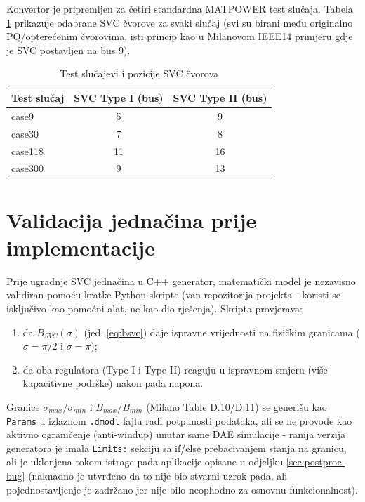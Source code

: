 \documentclass[11pt,a4paper]{report}
\begin{document}
Konvertor je pripremljen za četiri standardna MATPOWER test slučaja. Tabela
\ref{tab:test-cases} prikazuje odabrane SVC čvorove za svaki slučaj (svi su birani među
originalno PQ/opterećenim čvorovima, isti princip kao u Milanovom IEEE14 primjeru gdje je
SVC postavljen na bus 9).

\begin{table}[H]
\centering
\caption{Test slučajevi i pozicije SVC čvorova}
\label{tab:test-cases}
\begin{tabular}{@{}lcc@{}}
\toprule
Test slučaj & SVC Type I (bus) & SVC Type II (bus) \\
\midrule
case9   & 5  & 9  \\
case30  & 7  & 8  \\
case118 & 11 & 16 \\
case300 & 9  & 13 \\
\bottomrule
\end{tabular}
\end{table}

\section{Validacija jednačina prije implementacije}

Prije ugradnje SVC jednačina u C++ generator, matematički model je nezavisno validiran
pomoću kratke Python skripte (van repozitorija projekta - koristi se isključivo kao
pomoćni alat, ne kao dio rješenja). Skripta provjerava:
\begin{enumerate}
    \item da $B_{SVC}(\sigma)$ (jed. \ref{eq:bsvc}) daje ispravne vrijednosti na fizičkim
        granicama ($\sigma=\pi/2$ i $\sigma=\pi$);
    \item da oba regulatora (Type I i Type II) reaguju u ispravnom smjeru (više
        kapacitivne podrške) nakon pada napona.
\end{enumerate}

Granice $\sigma_{max}/\sigma_{min}$ i $B_{max}/B_{min}$ (Milano Table D.10/D.11) se
generišu kao \texttt{Params} u izlaznom \texttt{.dmodl} fajlu radi potpunosti podataka, ali
se ne provode kao aktivno ograničenje (anti-windup) unutar same DAE simulacije - ranija
verzija generatora je imala \texttt{Limits:} sekciju sa if/else prebacivanjem stanja na
granicu, ali je uklonjena tokom istrage pada aplikacije opisane u odjeljku
\ref{sec:postproc-bug} (naknadno je utvrđeno da to nije bio stvarni uzrok pada, ali
pojednostavljenje je zadržano jer nije bilo neophodno za osnovnu funkcionalnost).
\end{document}
